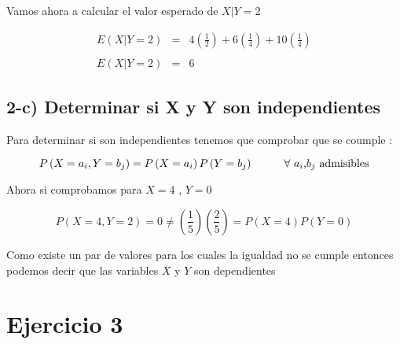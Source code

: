 \documentclass[12pt]{article}
\begin{document}
\begin{flushleft}
    Vamos ahora a calcular el valor esperado de $X|Y=2$
\end{flushleft}

\begin{equation*}
    \begin{array}{rcl}
        \displaystyle E\left(X|Y=2\right) & = & \displaystyle 4 \left(\frac{1}{2}\right) + 6 \left(\frac{1}{4}\right) + 10\left(\frac{1}{4}\right)
        \\
        \\
        \displaystyle E\left(X|Y=2\right) & = & 6
    \end{array}
\end{equation*}


\subsection*{2-c)  Determinar si X y Y  son independientes}

\begin{flushleft}
    Para determinar si son independientes tenemos que comprobar que se coumple :


    \begin{equation*}
        P \left(X = a_i , Y = b_j\right)  = P \left(X = a_i\right) P \left(Y= b_j\right)
        \hspace*{1cm }
        \mbox{$\forall$ $a_i$,$b_j$ admisibles}
    \end{equation*}


    Ahora si comprobamos para $X = 4 $ , $Y = 0$


    \begin{equation*}
        P \left(X =4 , Y =2 \right) = 0 \neq \left(\frac{1}{5}\right) \left(\frac{2}{5}\right)  = P\left(X =4 \right)  P \left(Y = 0\right)
    \end{equation*}


    Como existe un par de valores para los cuales la igualdad no se cumple entonces
    podemos decir que las variables $X$ y $Y$ son dependientes
\end{flushleft}



\section*{Ejercicio 3}
\end{document}
